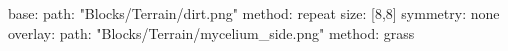 base:
  path: "Blocks/Terrain/dirt.png"
  method: repeat
  size: [8,8]
  symmetry: none
overlay:
  path: "Blocks/Terrain/mycelium_side.png"
  method: grass